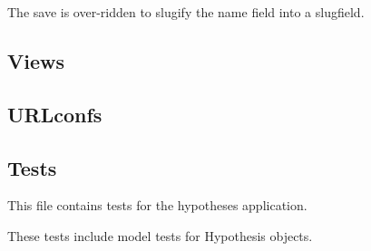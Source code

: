 \documentclass[letterpaper,10pt,english]{sphinxmanual}
\begin{document}
\begin{fulllineitems}

\begin{fulllineitems}
\label{api:experimentdb.hypotheses.models.Process.hypothesis_set}
\end{fulllineitems}


\begin{fulllineitems}
\label{api:experimentdb.hypotheses.models.Process.save}
The save is over-ridden to slugify the name field into a slugfield.


\end{fulllineitems}


\end{fulllineitems}



\subsection{Views}
\label{api:id28}\label{api:module-experimentdb.hypotheses.views}

\subsection{URLconfs}
\label{api:id29}\label{api:module-experimentdb.hypotheses.urls}

\subsection{Tests}
\label{api:id30}\label{api:module-experimentdb.hypotheses.tests}
This file contains tests for the hypotheses application.


These tests include model tests for Hypothesis objects.

\end{document}
